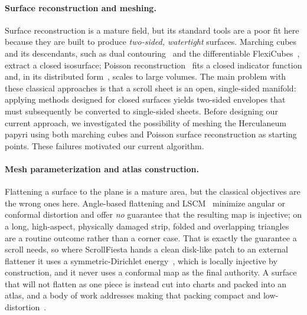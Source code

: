 \paragraph{Surface reconstruction and meshing.} Surface reconstruction is a mature field, but its standard tools are a poor fit here because they are built to produce {\em two-sided, watertight} surfaces. Marching cubes~\cite{lorensen1998marching} and its descendants, such as dual contouring~\cite{ju2002dual} and the differentiable FlexiCubes~\cite{shen2023flexicubes}, extract a closed isosurface; Poisson reconstruction~\cite{kazhdan2006poisson} fits a closed indicator function and, in its distributed form~\cite{kazhdan2023distributed}, scales to large volumes. The main problem with these classical approaches is that a scroll sheet is an open, single-sided manifold: applying methods designed for closed surfaces yields two-sided envelopes that must subsequently be converted to single-sided sheets. Before designing our current approach, we investigated the possibility of meshing the Herculaneum papyri using both marching cubes and Poisson surface reconstruction as starting points. These failures motivated our current algorithm.

\paragraph{Mesh parameterization and atlas construction.} Flattening a surface to the plane is a mature area, but the classical objectives are the wrong ones here. Angle-based flattening and LSCM~\cite{sheffer2005abf++} minimize angular or conformal distortion and offer {\em no} guarantee that the resulting map is injective; on a long, high-aspect, physically damaged strip, folded and overlapping triangles are a routine outcome rather than a corner case. That is exactly the guarantee a scroll needs, so where ScrollFiesta hands a clean disk-like patch to an external flattener it uses a symmetric-Dirichlet energy~\cite{smith2015bijective}, which is locally injective by construction, and it never uses a conformal map as the final authority. A surface that will not flatten as one piece is instead cut into charts and packed into an atlas, and a body of work addresses making that packing compact and low-distortion~\cite{limper2018box}.

